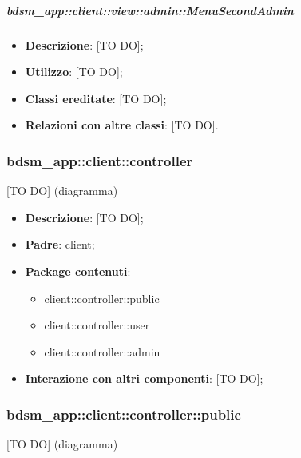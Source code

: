 			\subparagraph{bdsm\_app::client::view::admin::MenuSecondAdmin} %
			\label{subp:bdsm_app_client_view_admin_menusecondadmin}
				\begin{itemize}
					\item \textbf{Descrizione}: [TO DO];
					\item \textbf{Utilizzo}: [TO DO];
					\item \textbf{Classi ereditate}: [TO DO];
					\item \textbf{Relazioni con altre classi}: [TO DO].
				\end{itemize}


	\pagebreak

	\subsubsection{bdsm\_app::client::controller} %
	\label{ssub:bdsm_app_client_controller}
	[TO DO] (diagramma) \newline \newline

	\begin{itemize}
		\item \textbf{Descrizione}: [TO DO];
		\item \textbf{Padre}: client;
		\item \textbf{Package contenuti}:
			\begin{itemize}
				\item client::controller::public
				\item client::controller::user
				\item client::controller::admin
			\end{itemize}
		\item \textbf{Interazione con altri componenti}: [TO DO];
	\end{itemize}


	\subsubsection{bdsm\_app::client::controller::public} %
	\label{ssub:bdsm_app_client_controller_public}
	[TO DO] (diagramma) \newline \newline

